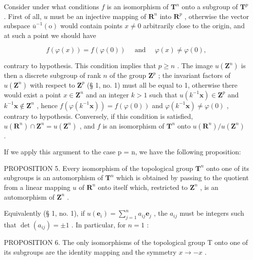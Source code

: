 Consider under what conditions \(f\) is an isomorphism of \(\mathbf{T}^n\) onto a subgroup of \(\mathbf{T}^p\) . First of all, \(u\) must be an injective mapping of \(\mathbf{R}^n\) into \(\mathbf{R}^p\) , otherwise the vector subspace \(\overline{u}^{-1}(\mathrm{o})\) would contain points \(x \neq 0\) arbitrarily close to the origin, and at such a point we should have

\[
f (\varphi (x)) = f (\varphi (0)) \quad \text { and } \quad \varphi (x) \neq \varphi (0),
\]

contrary to hypothesis. This condition implies that \(p \geqslant n\) . The image \(u(\mathbf{Z}^n)\) is then a discrete subgroup of rank \(n\) of the group \(\mathbf{Z}^p\) ; the invariant factors of \(u(\mathbf{Z}^n)\) with respect to \(\mathbf{Z}^p\) (§ 1, no. 1) must all be equal to 1, otherwise there would exist a point \(x \in \mathbf{Z}^n\) and an integer \(k > 1\) such that \(u(k^{-1}\mathbf{x}) \in \mathbf{Z}^p\) and \(k^{-1}\mathbf{x} \notin \mathbf{Z}^n\) , hence \(f(\varphi(k^{-1}\mathbf{x})) = f(\varphi(0))\) and \(\varphi(k^{-1}\mathbf{x}) \neq \varphi(0)\) , contrary to hypothesis. Conversely, if this condition is satisfied, \(u(\mathbf{R}^n) \cap \mathbf{Z}^n = u(\mathbf{Z}^n)\) , and \(f\) is an isomorphism of \(\mathbf{T}^n\) onto \(u(\mathbf{R}^n)/u(\mathbf{Z}^n)\) .

If we apply this argument to the case p = n, we have the following proposition:

PROPOSITION 5. Every isomorphism of the topological group \(\mathbf{T}^n\) onto one of its subgroups is an automorphism of \(\mathbf{T}^n\) which is obtained by passing to the quotient from a linear mapping \(u\) of \(\mathbf{R}^n\) onto itself which, restricted to \(\mathbf{Z}^n\) , is an automorphism of \(\mathbf{Z}^n\) .

Equivalently (§ 1, no. 1), if \(u(\boldsymbol{e}_i) = \sum_{j=1}^{n} a_{ij} \boldsymbol{e}_j\) , the \(a_{ij}\) must be integers such that \(\det(a_{ij}) = \pm 1\) . In particular, for \(n = 1\) :

PROPOSITION 6. The only isomorphisms of the topological group T onto one of its subgroups are the identity mapping and the symmetry \(x \to -x\) .

